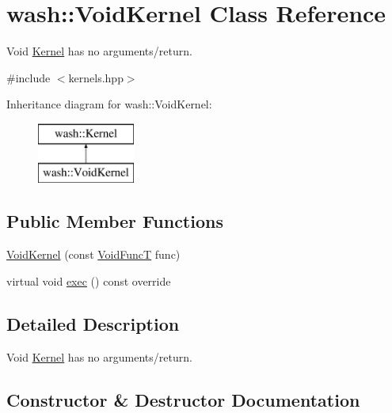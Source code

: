 \hypertarget{classwash_1_1VoidKernel}{}\section{wash\+:\+:Void\+Kernel Class Reference}
\label{classwash_1_1VoidKernel}


Void \mbox{\hyperlink{classwash_1_1Kernel}{Kernel}} has no arguments/return.  




{\ttfamily \#include $<$kernels.\+hpp$>$}

Inheritance diagram for wash\+:\+:Void\+Kernel\+:\begin{figure}[H]
\begin{center}
\leavevmode
\includegraphics[height=2.000000cm]{classwash_1_1VoidKernel}
\end{center}
\end{figure}
\subsection*{Public Member Functions}
\begin{DoxyCompactItemize}
\item 
\mbox{\hyperlink{classwash_1_1VoidKernel_abe7159c42c48bf15cf3d69dbf09388dc}{Void\+Kernel}} (const \mbox{\hyperlink{namespacewash_a7de7a4195ce994df4dd54ff86e3fff20}{Void\+FuncT}} func)
\item 
virtual void \mbox{\hyperlink{classwash_1_1VoidKernel_a2a271788509bac47a96dbbecd7fbe90e}{exec}} () const override
\end{DoxyCompactItemize}


\subsection{Detailed Description}
Void \mbox{\hyperlink{classwash_1_1Kernel}{Kernel}} has no arguments/return. 

\subsection{Constructor \& Destructor Documentation}
\mbox{\label{classwash_1_1VoidKernel_abe7159c42c48bf15cf3d69dbf09388dc}} 
